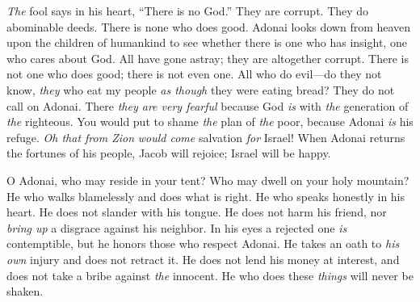 \begin{biblechapter} %
 \textit{The} fool says in his heart, “There is no God.” 
They are corrupt. 
They do abominable deeds. 
There is none who does good.
\verse Adonai looks down from heaven upon the children of humankind 
to see whether there is one who has insight, 
one who cares about God.
\verse All have gone astray; 
they are altogether corrupt. 
There is not one who does good; 
there is not even one.
\verse All who do evil—do they not know, 
\textit{they} who eat my people \textit{as though} they were eating bread? 
They do not call on Adonai.
\verse There \textit{they are very fearful} 
because God \textit{is} with \textit{the} generation of \textit{the} righteous.
\verse You would put to shame \textit{the} plan of \textit{the} poor, 
because Adonai \textit{is} his refuge.
\verse \textit{Oh that from Zion} \textit{would come} salvation \textit{for} Israel! 
When Adonai returns the fortunes of his people, 
Jacob will rejoice; Israel will be happy.
\end{biblechapter}

\begin{biblechapter} %
 O Adonai, who may reside in your tent? 
Who may dwell on your holy mountain?
\verse He who walks blamelessly and does what is right. 
He who speaks honestly in his heart.
\verse He does not slander with his tongue. 
He does not harm his friend, 
nor \textit{bring up} a disgrace against his neighbor.
\verse In his eyes a rejected one \textit{is} contemptible, 
but he honors those who respect Adonai. 
He takes an oath to \textit{his own} injury and does not retract it.
\verse He does not lend his money at interest, 
and does not take a bribe against \textit{the} innocent. 
He who does these \textit{things} 
will never be shaken.
\end{biblechapter}

